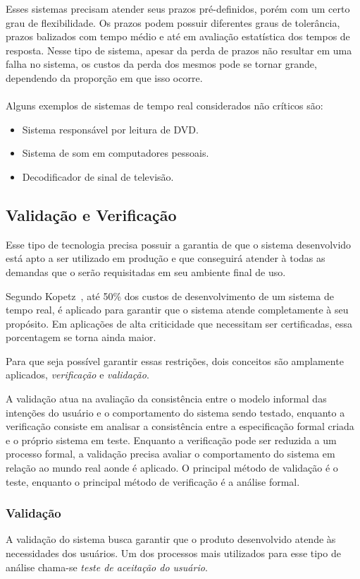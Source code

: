 Esses sistemas precisam atender seus prazos pré-definidos, porém com um certo grau de flexibilidade.
Os prazos podem possuir diferentes graus de tolerância, prazos balizados com tempo médio e até em avaliação
estatística dos tempos de resposta. Nesse tipo de sistema, apesar da perda de prazos não resultar em uma
falha no sistema, os custos da perda dos mesmos pode se tornar grande, dependendo da proporção em que isso
ocorre.~\cite{Li:2003:RCE:829584} \\\\
Alguns exemplos de sistemas de tempo real considerados não críticos são:
\begin{itemize}
\item Sistema responsável por leitura de DVD.
\item Sistema de som em computadores pessoais.
\item Decodificador de sinal de televisão.
\end{itemize}

\subsection{Validação e Verificação}
Esse tipo de tecnologia precisa possuir a garantia de que o sistema desenvolvido está apto a ser utilizado em produção
e que conseguirá atender à todas as demandas que o serão requisitadas em seu ambiente final de uso.

Segundo Kopetz~\cite{Kopetz:1997:RSD:523911}, até 50\% dos custos de desenvolvimento de um sistema de tempo real, é aplicado
para garantir que o sistema atende completamente à seu propósito. Em aplicações de alta criticidade que necessitam ser certificadas,
essa porcentagem se torna ainda maior.

Para que seja possível garantir essas restrições, dois conceitos são amplamente aplicados,
\textit{verificação}  e \textit{validação}.

A validação atua na avaliação da consistência entre o modelo informal das intenções do usuário e
o comportamento do sistema sendo testado, enquanto a verificação consiste em analisar a consistência
entre a especificação formal criada e o próprio sistema em teste. Enquanto a verificação pode ser
reduzida a um processo formal, a validação precisa avaliar o comportamento do sistema em relação ao mundo real
aonde é aplicado. O principal método de validação é o teste, enquanto o principal método de verificação é a
análise formal.

\subsubsection{Validação}
A validação do sistema busca garantir que o produto desenvolvido atende às necessidades dos usuários. Um dos processos
mais utilizados para esse tipo de análise chama-se \textit{teste de aceitação do usuário}.

